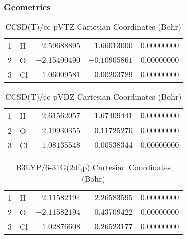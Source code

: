\documentclass[10pt,oneside]{article}
\begin{document}
\clearpage

\subsection{\ \ \ }

\subsubsection*{Geometries}
\begin{table}[h!]
\centering
\caption{CCSD(T)/cc-pVTZ Cartesian Coordinates (Bohr)}
\begin{tabular}{llrrr}
1  & H  & $-2.59688895$ & $ 1.66013000$ & $ 0.00000000$ \\
2  & O  & $-2.15400490$ & $-0.10905861$ & $ 0.00000000$ \\
3  & Cl & $ 1.06009581$ & $ 0.00203789$ & $ 0.00000000$ \\
\end{tabular}
\end{table}

\begin{table}[h!]
\centering
\caption{CCSD(T)/cc-pVDZ Cartesian Coordinates (Bohr)}
\begin{tabular}{llrrr}
1  & H  & $-2.61562057$ & $ 1.67409441$ & $ 0.00000000$ \\
2  & O  & $-2.19930355$ & $-0.11725270$ & $ 0.00000000$ \\
3  & Cl & $ 1.08135548$ & $ 0.00538344$ & $ 0.00000000$ \\
\end{tabular}
\end{table}

\begin{table}[h!]
\centering
\caption{B3LYP/6-31G(2df,p) Cartesian Coordinates (Bohr)}
\begin{tabular}{llrrr}
1  & H  & $-2.11582194$ & $ 2.26583595$ & $ 0.00000000$ \\
2  & O  & $-2.11582194$ & $ 0.43709422$ & $ 0.00000000$ \\
3  & Cl & $ 1.02876608$ & $-0.26523177$ & $ 0.00000000$ \\
\end{tabular}
\end{table}

\clearpage
\end{document}
